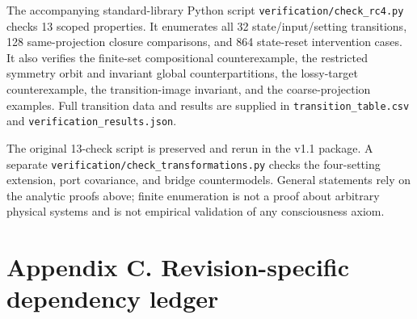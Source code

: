 \documentclass[
  11pt,
  a4paper,
]{article}
\begin{document}
The accompanying standard-library Python script
\texttt{verification/check\_rc4.py} checks 13 scoped properties. It
enumerates all 32 state/input/setting transitions, 128 same-projection
closure comparisons, and 864 state-reset intervention cases. It also
verifies the finite-set compositional counterexample, the restricted
symmetry orbit and invariant global counterpartitions, the lossy-target
counterexample, the transition-image invariant, and the
coarse-projection examples. Full transition data and results are
supplied in \texttt{transition\_table.csv} and
\texttt{verification\_results.json}.

The original 13-check script is preserved and rerun in the v1.1 package.
A separate \texttt{verification/check\_transformations.py} checks the
four-setting extension, port covariance, and bridge countermodels.
General statements rely on the analytic proofs above; finite enumeration
is not a proof about arbitrary physical systems and is not empirical
validation of any consciousness axiom.

\hypertarget{appendix-c.-revision-specific-dependency-ledger}{%
\clearpage
\section{Appendix C. Revision-specific dependency
ledger}\label{appendix-c.-revision-specific-dependency-ledger}}
\end{document}
